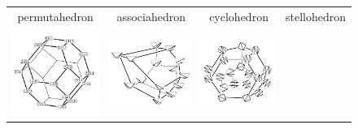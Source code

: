 \documentclass{amsart}
\theoremstyle{definition}
\begin{document}
\begin{figure}[t]
	\capstart
	\begin{adjustbox}{center}
		\begin{tabular}{c@{\;}c@{\;}c@{\;}c}
			permutahedron &
			associahedron &
			cyclohedron &
			stellohedron \\
			\includegraphics[scale=.6]{permutahedron} &
			\includegraphics[scale=.6]{associahedron} &
			\includegraphics[scale=.6]{cyclohedron} &

\end{tabular}
\end{adjustbox}
\end{figure}
\end{document}
